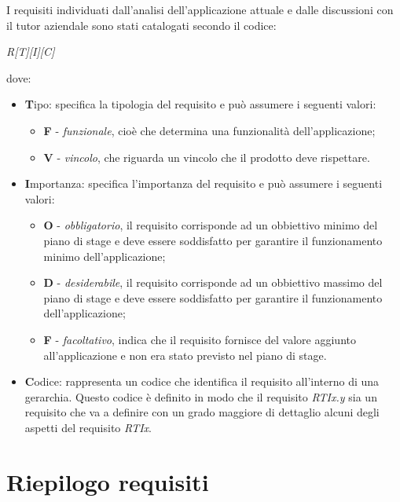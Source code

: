 I requisiti individuati dall'analisi dell'applicazione attuale e dalle discussioni con il tutor aziendale sono stati catalogati secondo il codice:
\begin{center}
\textit{R[T][I][C]}
\end{center}
dove:
\begin{itemize}
\item \textbf{T}ipo: specifica la tipologia del requisito e può assumere i seguenti valori:
	\begin{itemize}
	\item \textbf{F} - \textit{funzionale}, cioè che determina una funzionalità dell'applicazione;
	\item \textbf{V} - \textit{vincolo}, che riguarda un vincolo che il prodotto deve rispettare.
	\end{itemize}
\item \textbf{I}mportanza: specifica l'importanza del requisito e può assumere i seguenti valori:
	\begin{itemize}
	\item \textbf{O} - \textit{obbligatorio}, il requisito corrisponde ad un obbiettivo minimo del piano di stage e deve essere soddisfatto per garantire il funzionamento minimo dell'applicazione;
	\item \textbf{D} - \textit{desiderabile}, il requisito corrisponde ad un obbiettivo massimo del piano di stage e deve essere soddisfatto per garantire il funzionamento dell'applicazione;
	\item \textbf{F} - \textit{facoltativo}, indica che il requisito fornisce del valore aggiunto all'applicazione e non era stato previsto nel piano di stage.
	\end{itemize}
\item \textbf{C}odice: rappresenta un codice che identifica il requisito all'interno di una gerarchia. Questo codice è definito in modo che il requisito \textit{RTIx.y} sia un requisito che va a definire con un grado maggiore di dettaglio alcuni degli aspetti del requisito \textit{RTIx}.
\end{itemize}



\section{Riepilogo requisiti}

